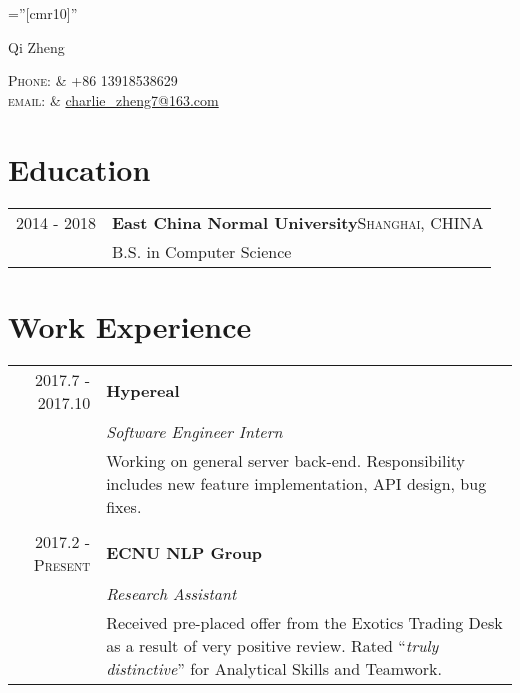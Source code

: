 \documentclass[a4paper,10pt]{article}
\begin{document}
	
	
	\pagestyle{empty} %
	
	\font\fb=''[cmr10]'' %
	
	\par{\centering
		{\Large Qi Zheng \textsc{}
		}\par}
	\centering\textsc{Phone:}     & +86 13918538629\\
	\centering\textsc{email:}     & \href{mailto:charlie\_zheng7@163.com}{charlie\_zheng7@163.com}
	
	
	\section{Education}
	\begin{tabular}{rl}	
		2014 - 2018 & \textbf{East China Normal University}\qquad \qquad \qquad \qquad \qquad \textsc{Shanghai, CHINA}\\
		
		& B.S. in Computer Science\\
		
	\end{tabular}
	
	\section{Work Experience}
	\begin{tabular}{r|p{11cm}}
		\textsc{2017.7 - 2017.10} & \textbf{Hypereal}\\&\emph{Software Engineer Intern}\\&\footnotesize{Working on general server back-end. Responsibility includes new feature implementation, API design, bug fixes.}\\\multicolumn{2}{c}{} \\
		\textsc{2017.2 - Present} & \textbf{ECNU NLP Group}\\&\emph{Research Assistant}\\&\footnotesize{Received pre-placed offer from the Exotics Trading Desk as a result of very positive review. Rated ``\emph{truly distinctive}'' for Analytical Skills and Teamwork.}
	\end{tabular}
	
\end{document}
